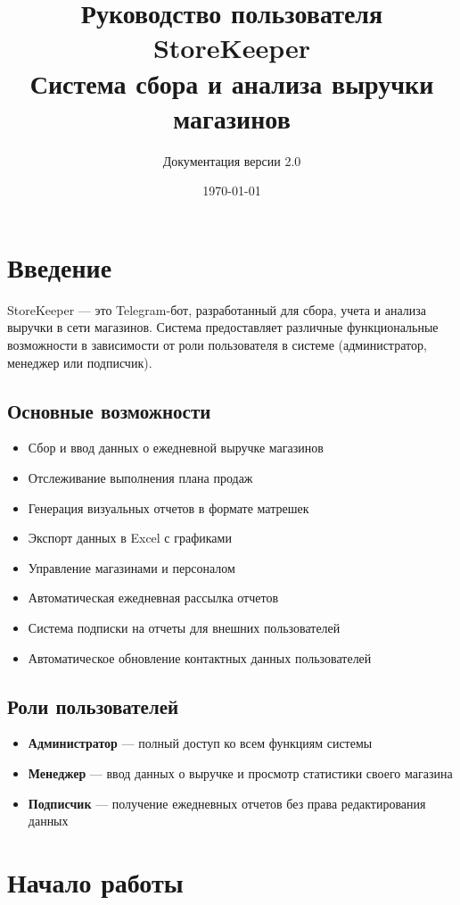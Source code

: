 \documentclass[a4paper,12pt]{article}
\title{\textbf{Руководство пользователя}\\
{\huge StoreKeeper}\\
Система сбора и анализа выручки магазинов}
\author{Документация версии 2.0}
\date{\today}
\begin{document}
\maketitle
\thispagestyle{empty}
\tableofcontents
\newpage

\section{Введение}

StoreKeeper — это Telegram-бот, разработанный для сбора, учета и анализа выручки в сети магазинов. Система предоставляет различные функциональные возможности в зависимости от роли пользователя в системе (администратор, менеджер или подписчик).

\subsection{Основные возможности}
\begin{itemize}
    \item Сбор и ввод данных о ежедневной выручке магазинов
    \item Отслеживание выполнения плана продаж
    \item Генерация визуальных отчетов в формате матрешек
    \item Экспорт данных в Excel с графиками
    \item Управление магазинами и персоналом
    \item Автоматическая ежедневная рассылка отчетов
    \item Система подписки на отчеты для внешних пользователей
    \item Автоматическое обновление контактных данных пользователей
\end{itemize}

\subsection{Роли пользователей}
\begin{itemize}
    \item \textbf{Администратор} — полный доступ ко всем функциям системы
    \item \textbf{Менеджер} — ввод данных о выручке и просмотр статистики своего магазина
    \item \textbf{Подписчик} — получение ежедневных отчетов без права редактирования данных
\end{itemize}

\section{Начало работы}
\end{document}
